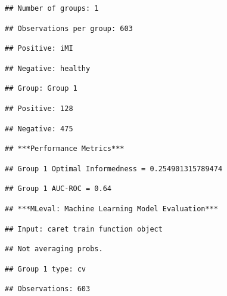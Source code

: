 \documentclass[
]{article}
\begin{document}
\begin{verbatim}
## Number of groups: 1
\end{verbatim}

\begin{verbatim}
## Observations per group: 603
\end{verbatim}

\begin{verbatim}
## Positive: iMI
\end{verbatim}

\begin{verbatim}
## Negative: healthy
\end{verbatim}

\begin{verbatim}
## Group: Group 1
\end{verbatim}

\begin{verbatim}
## Positive: 128
\end{verbatim}

\begin{verbatim}
## Negative: 475
\end{verbatim}

\begin{verbatim}
## ***Performance Metrics***
\end{verbatim}

\begin{verbatim}
## Group 1 Optimal Informedness = 0.254901315789474
\end{verbatim}

\begin{verbatim}
## Group 1 AUC-ROC = 0.64
\end{verbatim}

\begin{verbatim}
## ***MLeval: Machine Learning Model Evaluation***
\end{verbatim}

\begin{verbatim}
## Input: caret train function object
\end{verbatim}

\begin{verbatim}
## Not averaging probs.
\end{verbatim}

\begin{verbatim}
## Group 1 type: cv
\end{verbatim}

\begin{verbatim}
## Observations: 603
\end{verbatim}
\end{document}
